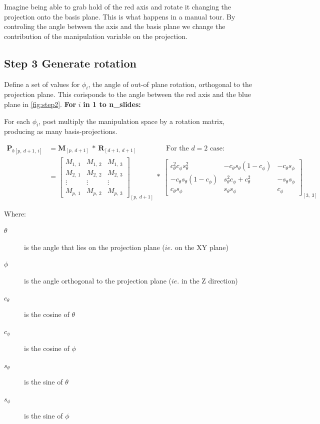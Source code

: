 \documentclass{monashthesis}
\begin{document}
Imagine being able to grab hold of the red axis and rotate it changing
the projection onto the basis plane. This is what happens in a manual
tour. By controling the angle between the axis and the basis plane we
change the contribution of the manipulation variable on the projection.

\subsection{Step 3 Generate rotation}\label{step-3-generate-rotation}

Define a set of values for \(\phi_i\), the angle of out-of plane
rotation, orthogonal to the projection plane. This corisponds to the
angle between the red axis and the blue plane in \ref{fig:step2}.
\textbf{For } \(i\) \textbf{in 1 to n\_slides:}

For each \(\phi_i\), post multiply the manipulation space by a rotation
matrix, producing as many basis-projections.

\begin{align*}
  \textbf{P}_{b[p,~d+1,~i]}
  &= \textbf{M}_{[p,~d+1]} ~*~ \textbf{R}_{[d+1,~d+1]} 
    ~~~~~~~~~~~~~~~~~~~\text{For the $d=2$ case:} \\
  &= \begin{bmatrix}
    M_{1,~1} & M_{1,~2} & M_{1,~3} \\
    M_{2,~1} & M_{2,~2} & M_{2,~3} \\
    \vdots   & \vdots   & \vdots   \\
    M_{p,~1} & M_{p,~2} & M_{p,~3}
  \end{bmatrix}_{[p,~d+1]}
    ~*~
  \begin{bmatrix}
    c_\theta^2 c_\phi s_\theta^2 &
    -c_\theta s_\theta (1 - c_\phi) &
    -c_\theta s_\phi \\
    -c_\theta s_\theta (1 - c_\phi) &
    s_\theta^2 c_\phi + c_\theta^2 &
    -s_\theta s_\phi \\
    c_\theta s_\phi &
    s_\theta s_\phi &
    c_\phi
  \end{bmatrix}_{[3,~3]}
\end{align*}

Where:

\begin{description}
  \item[$\theta$] is the angle that lies on the projection plane ($ie.$ on the XY plane)
  \item[$\phi$] is the angle orthogonal to the projection plane ($ie.$ in the Z direction)
  \item[$c_\theta$] is the cosine of $\theta$
  \item[$c_\phi$]   is the cosine of $\phi$
  \item[$s_\theta$] is the sine of   $\theta$
  \item[$s_\phi$]   is the sine of   $\phi$
\end{description}
\end{document}
